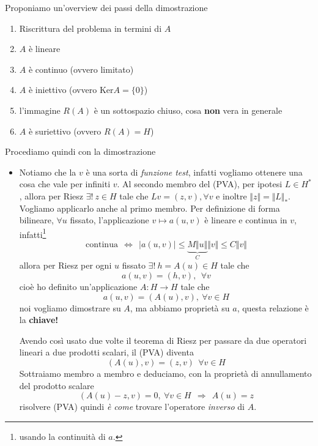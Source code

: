\documentclass[10pt,a4paper,twoside,openright]{book}
\begin{document}
\begin{dimostrazione}
Proponiamo un'overview dei passi della dimostrazione
\begin{enumerate}
\item[(0)] Riscrittura del problema in termini di $A$
\item[(1)] $A$ è lineare
\item[(2)] $A$ è continuo (ovvero limitato)
\item[(3)] $A$ è iniettivo (ovvero $\mathrm{Ker} A=\{0\}$)
\item[(3.5)] l'immagine $R(A)$ è un sottospazio chiuso, cosa \textbf{non} vera in generale
\item[(4)] $A$ è suriettivo (ovvero $R(A) =H$)
\end{enumerate}
Procediamo quindi con la dimostrazione
\begin{itemize}
\item[(0)]

Notiamo che la $v$ è una sorta di \textit{funzione test}, infatti vogliamo ottenere una cosa che vale per infiniti $v$. Al secondo membro del (PVA), per ipotesi $L\in H^{*}$, allora per Riesz $\exists !\ z\in H$ tale che $Lv=(z,v),\forall v$ e inoltre $\Vert z\Vert =\Vert L\Vert _{*}$. Vogliamo applicarlo anche al primo membro. Per definizione di forma bilineare, $\forall u$ fissato, l'applicazione $v\mapsto a(u,v)$ è lineare e continua in $v$, infatti\footnote{usando la continuità di $a$.}
\begin{equation*}
\text{continua} \ \ \Leftrightarrow \ \ | a(u,v)| \leqslant \underbrace{M\Vert u\Vert }_{C}\Vert v\Vert \leqslant C\Vert v\Vert 
\end{equation*}
allora per Riesz per ogni $u$ fissato $\exists !\ h=A(u) \in H$ tale che
\begin{equation*}
a(u,v) =(h,v),\ \ \forall v
\end{equation*}
cioè ho definito un'applicazione $A:H\rightarrow H$ tale che
\begin{equation*}
\boxed{a(u,v) =(A(u),v),\ \forall v\in H}
\end{equation*}
noi vogliamo dimostrare su $A$, ma abbiamo proprietà su $a$, questa relazione è la \textbf{chiave!}

Avendo così usato due volte il teorema di Riesz per passare da due operatori lineari a due prodotti scalari, il (PVA) diventa
\begin{equation*}
(A(u),v) =(z,v) \ \ \forall v\in H
\end{equation*}
Sottraiamo membro a membro e deduciamo, con la proprietà di annullamento del prodotto scalare
\begin{equation*}
(A(u) -z,v) =0,\ \forall v\in H\ \ \Rightarrow \ \ \boxed{A(u) =z}
\end{equation*}
risolvere (PVA) quindi \textit{è come} trovare l'operatore \textit{inverso} di $A$.




\end{itemize}
\end{dimostrazione}
\end{document}
